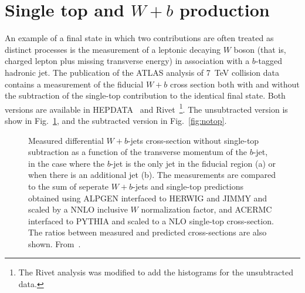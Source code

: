 \documentclass[floatfix]{article}
\begin{document}
\section{Single top and $W+b$ production}

An example of a final state in which two contributions are often treated as distinct processes is the measurement of a leptonic
decaying $W$ boson (that is, charged lepton plus missing transverse energy) in association with a $b$-tagged hadronic jet. 
The publication of the ATLAS analysis of 7~TeV collision data\cite{Aad:2013vka} contains a measurement of the fiducial $W+b$ 
cross section both with and without the subtraction of the single-top contribution to the identical final state. Both
versions are available in HEPDATA~\cite{} and Rivet~\cite{Buckley:2010ar}\footnote{The Rivet analysis was modified to add the histograms for the unsubtracted data.}. 
The unsubtracted version is show in Fig.~\ref{fig:wb}, and the subtracted version in Fig.~\ref{fig:notop}. 

\begin{figure}%
\centering
{}
\caption{\label{fig:wb}
Measured differential $W+b$-jets cross-section without single-top subtraction as a function of the transverse momentum of the $b$-jet, in the 
case where the $b$-jet is the only jet in the fiducial region (a) or when there is an additional jet (b). 
The measurements are compared to the sum of seperate $W+b$-jets and single-top predictions 
obtained using ALPGEN interfaced to HERWIG and JIMMY and scaled by a NNLO inclusive $W$ normalization factor, and ACERMC interfaced to PYTHIA and scaled to a 
NLO single-top cross-section. 
The ratios between measured and predicted cross-sections are also shown. From~\protect\cite{Aad:2013vka}.}
\end{figure}
\end{document}
